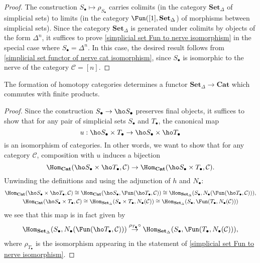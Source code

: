 \begin{proof}
The construction $S_\bullet\mapsto\rho_{S_\bullet}$ carries colimits (in the category $\mathbf{Set}_\Delta$ of simplicial sets) to limits (in the category $\Fun([1],\mathbf{Set}_\Delta$) of morphisms between simplicial sets). Since the category $\mathbf{Set}_\Delta$ is generated under colimits by objects of the form $\Delta^n$, it suffices to prove \cref{simplicial set Fun to nerve isomorphism} in the special case where $S_\bullet=\Delta^n$. In this case, the desired result follows from \cref{simplicial set functor of nerve cat isomorphism}, since $S_\bullet$ is isomorphic to the nerve of the category $\mathcal{C}=[n]$.
\end{proof}
\begin{corollary}\label{simplicial set homotopy cat functor finite product}
The formation of homotopy categories determines a functor $\mathbf{Set}_\Delta\to\mathbf{Cat}$ which commutes with finite products.
\end{corollary}
\begin{proof}
Since the construction $S_\bullet\to \ho S_\bullet$ preserves final objects, it suffices to show that for any pair of simplicial sets $S_\bullet$ and $T_\bullet$, the canonical map
\[u:\ho S_\bullet\times T_\bullet\to \ho S_\bullet\times \ho T_\bullet\]
is an isomorphism of categories. In other words, we want to show that for any category $\mathcal{C}$, composition with $u$ induces a bijection
\[\Hom_{\mathbf{Cat}}(\ho S_\bullet\times \ho T_\bullet,\mathcal{C})\to\Hom_{\mathbf{Cat}}(\ho S_\bullet\times T_\bullet,\mathcal{C}).\]
Unwinding the definitions and using the adjunction of $h$ and $N_\bullet$:
\begin{gather*}
\Hom_{\mathbf{Cat}}(\ho S_\bullet\times \ho T_\bullet,\mathcal{C})\cong\Hom_{\mathbf{Cat}}(\ho S_\bullet,\Fun(\ho T_\bullet,\mathcal{C}))\cong \Hom_{\mathbf{Set}_\Delta}(S_\bullet,N_\bullet(\Fun(\ho T_\bullet,\mathcal{C}))),\\
\Hom_{\mathbf{Cat}}(\ho S_\bullet\times T_\bullet,\mathcal{C})\cong\Hom_{\mathbf{Set}_\Delta}(S_\bullet\times T_\bullet,N_\bullet(\mathcal{C}))\cong\Hom_{\mathbf{Set}_\Delta}(S_\bullet,\Fun(T_\bullet,N_\bullet(\mathcal{C})))
\end{gather*}
we see that this map is in fact given by
\begin{align*}
\Hom_{\mathbf{Set}_\Delta}(S_\bullet,N_\bullet(\Fun(\ho T_\bullet,\mathcal{C})))\stackrel{\rho_{T_\bullet}\circ}{\to}\Hom_{\mathbf{Set}_\Delta}(S_\bullet,\Fun(T_\bullet,N_\bullet(\mathcal{C}))),
\end{align*}
where $\rho_{T_\bullet}$ is the isomorphism appearing in the statement of \cref{simplicial set Fun to nerve isomorphism}.
\end{proof}
